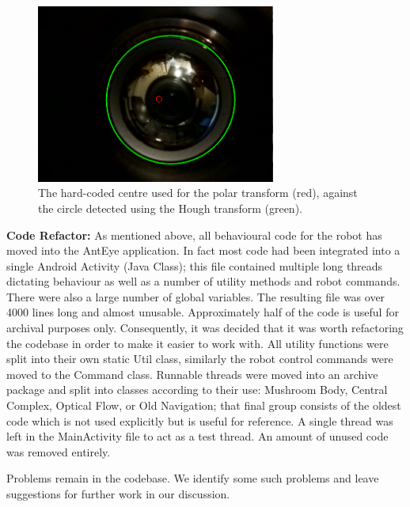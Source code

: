 \documentclass[a4paper,11pt,twoside,openright]{article}
\begin{document}
\begin{figure}
  \centering
  \includegraphics[width=0.7\textwidth]{Centre}
  \caption{\label{fig:centre} The hard-coded centre used for the polar transform
    (red), against the circle detected using the Hough transform (green).
   }
\end{figure}

\textbf{Code Refactor:} As mentioned above, all behavioural code for
the robot has moved into the AntEye application. In fact most code had
been integrated into a single Android Activity (Java Class); this file
contained multiple long threads dictating behaviour as well as a
number of utility methods and robot commands. There were also a large
number of global variables. The resulting file was over 4000 lines
long and almost unusable. Approximately half of the code is useful for
archival purposes only. Consequently, it was decided that it was worth
refactoring the codebase in order to make it easier to work with. All
utility functions were split into their own static Util class,
similarly the robot control commands were moved to the Command
class. Runnable threads were moved into an archive package and split
into classes according to their use: Mushroom Body, Central Complex,
Optical Flow, or Old Navigation; that final group consists of the
oldest code which is not used explicitly but is useful for
reference. A single thread was left in the MainActivity file to act
as a test thread. An amount of unused code was removed entirely.
\newline
\par

Problems remain in the codebase. We identify some such problems and
leave suggestions for further work in our discussion.
\newline\par
\end{document}
